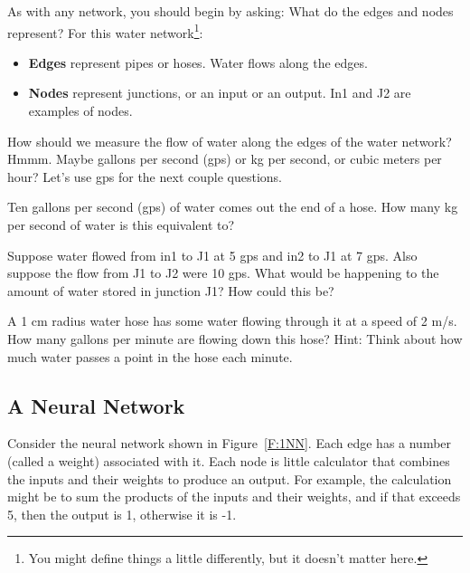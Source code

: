 As with any network, you should begin by asking: What do the edges and nodes represent? For this water network\footnote{You might define things a little differently, but it doesn't matter here.}:
\begin{itemize}
\item \textbf{Edges} represent pipes or hoses. Water flows along the edges.
\item \textbf{Nodes} represent junctions, or an input or an output. In1 and J2 are examples of nodes.
\end{itemize}
How should we measure the flow of water along the edges of the water network? Hmmm. Maybe gallons per second (gps) or kg per second, or cubic meters per hour? Let's use gps for the next couple questions.

\begin{blevel}
Ten gallons per second (gps) of water comes out the end of a hose. How many kg per second of water is this equivalent to?
\end{blevel}

\begin{blevel}
Suppose water flowed from in1 to J1 at 5 gps and in2 to J1 at 7 gps. Also suppose the flow from J1 to J2 were 10 gps. What would be happening to the amount of water stored in junction J1? How could this be?
\end{blevel}

\begin{clevel}
A 1 cm radius water hose has some water flowing through it at a speed of 2 m/s. How many gallons per minute are flowing down this hose? Hint: Think about how much water passes a point in the hose each minute.
\end{clevel}

\subsection{A Neural Network}
Consider the neural network shown in Figure~\ref{F:1NN}. Each edge has a number (called a weight) associated with it. Each node is little calculator that combines the inputs and their weights to produce an output. For example, the calculation might be to sum the products of the inputs and their weights, and if that exceeds 5, then the output is 1, otherwise it is -1. 

